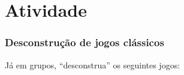 \expandafter\documentclass\expandafter[table, usenames, svgnames, dvipsnames, \classopts]{beamer}
\begin{document}
\section{Atividade}

\begin{frame}
	\frametitle{\textbf{Desconstrução de jogos clássicos}}

	\vspace{-1.5em}

	\begin{center}
		Já em grupos, ``desconstrua'' os seguintes jogos:
	\end{center}
	
	\vspace{-1.5em}

	\begin{figure}
	    \centering


\end{figure}
\end{frame}
\end{document}
